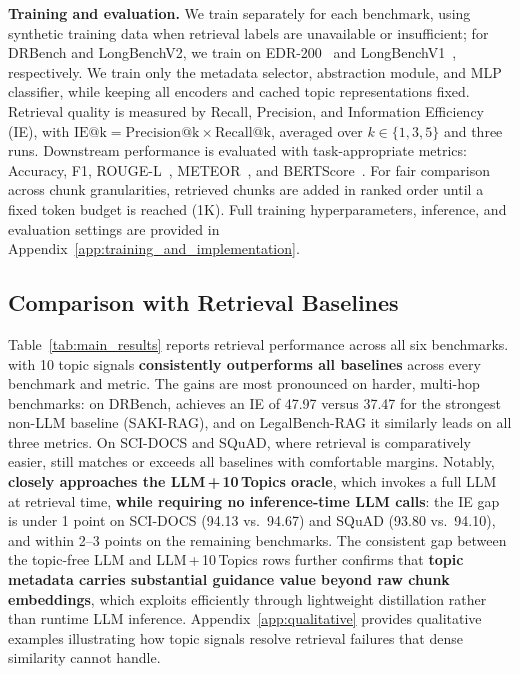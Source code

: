 \noindent
\textbf{Training and evaluation.}
We train \name{} separately for each benchmark, using synthetic training data when retrieval labels are unavailable or insufficient; for DRBench and LongBenchV2, we train on EDR-200~\cite{prabhakar2025enterprisedeepresearchsteerable} and LongBenchV1~\cite{bai-etal-2024-longbench}, respectively. We train only the metadata selector, abstraction module, and MLP classifier, while keeping all encoders and cached topic representations fixed. Retrieval quality is measured by Recall, Precision, and Information Efficiency (IE), with $\mathrm{IE@k}=\mathrm{Precision@k}\times\mathrm{Recall@k}$, averaged over $k\in\{1,3,5\}$ and three runs. Downstream performance is evaluated with task-appropriate metrics: Accuracy, F1, ROUGE-L~\cite{lin-2004-rouge}, METEOR~\cite{banerjee-lavie-2005-meteor}, and BERTScore~\cite{Zhang2020BERTScore}. For fair comparison across chunk granularities, retrieved chunks are added in ranked order until a fixed token budget is reached (1K). Full training hyperparameters, inference, and evaluation settings are provided in Appendix~\ref{app:training_and_implementation}.

\subsection{Comparison with Retrieval Baselines}
\label{subsec:retrieval_comparison}

Table~\ref{tab:main_results} reports retrieval performance across all six benchmarks. \name{} with 10 topic signals \textbf{consistently outperforms all baselines} across every benchmark and metric. The gains are most pronounced on harder, multi-hop benchmarks: on DRBench, \name{} achieves an IE of 47.97 versus 37.47 for the strongest non-LLM baseline (SAKI-RAG), and on LegalBench-RAG it similarly leads on all three metrics. On SCI-DOCS and SQuAD, where retrieval is comparatively easier, \name{} still matches or exceeds all baselines with comfortable margins. Notably, \textbf{\name{} closely approaches the LLM\,+\,10\,Topics oracle}, which invokes a full LLM at retrieval time, \textbf{while requiring no inference-time LLM calls}: the IE gap is under 1 point on SCI-DOCS (94.13 vs.\ 94.67) and SQuAD (93.80 vs.\ 94.10), and within 2--3 points on the remaining benchmarks. The consistent gap between the topic-free LLM and LLM\,+\,10\,Topics rows further confirms that \textbf{topic metadata carries substantial guidance value beyond raw chunk embeddings}, which \name{} exploits efficiently through lightweight distillation rather than
runtime LLM inference. Appendix~\ref{app:qualitative} provides qualitative examples illustrating how topic signals resolve retrieval failures that dense similarity cannot handle.

